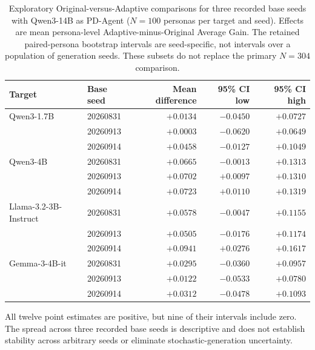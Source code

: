 \documentclass{ieeeaccess}
\begin{document}
\renewcommand{\thetable}{S4c}
\begin{table}[H]
\centering
\footnotesize
\setlength{\tabcolsep}{5pt}
\caption{Exploratory Original-versus-Adaptive comparisons for three recorded base seeds
with Qwen3-14B as PD-Agent ($N=100$ personas per target and seed).
Effects are mean persona-level Adaptive-minus-Original Average Gain.
The retained paired-persona bootstrap intervals are seed-specific, not intervals
over a population of generation seeds. These subsets do not replace the primary
$N=304$ comparison.}
\label{tab:generation-seed-results}
\begin{tabular*}{\textwidth}{@{\extracolsep{\fill}}llrrr@{}}
\toprule
Target & Base seed & Mean difference & 95\% CI low & 95\% CI high \\
\midrule
Qwen3-1.7B & 20260831 & $+0.0134$ & $-0.0450$ & $+0.0727$ \\
 & 20260913 & $+0.0003$ & $-0.0620$ & $+0.0649$ \\
 & 20260914 & $+0.0458$ & $-0.0127$ & $+0.1049$ \\
\addlinespace
Qwen3-4B & 20260831 & $+0.0665$ & $-0.0013$ & $+0.1313$ \\
 & 20260913 & $+0.0702$ & $+0.0097$ & $+0.1310$ \\
 & 20260914 & $+0.0723$ & $+0.0110$ & $+0.1319$ \\
\addlinespace
Llama-3.2-3B-Instruct & 20260831 & $+0.0578$ & $-0.0047$ & $+0.1155$ \\
 & 20260913 & $+0.0505$ & $-0.0176$ & $+0.1174$ \\
 & 20260914 & $+0.0941$ & $+0.0276$ & $+0.1617$ \\
\addlinespace
Gemma-3-4B-it & 20260831 & $+0.0295$ & $-0.0360$ & $+0.0957$ \\
 & 20260913 & $+0.0122$ & $-0.0533$ & $+0.0780$ \\
 & 20260914 & $+0.0312$ & $-0.0478$ & $+0.1093$ \\
\bottomrule
\end{tabular*}
\end{table}

All twelve point estimates are positive, but nine of their intervals include zero.
The spread across three recorded base seeds is descriptive and does not establish
stability across arbitrary seeds or eliminate stochastic-generation uncertainty.
\end{document}
